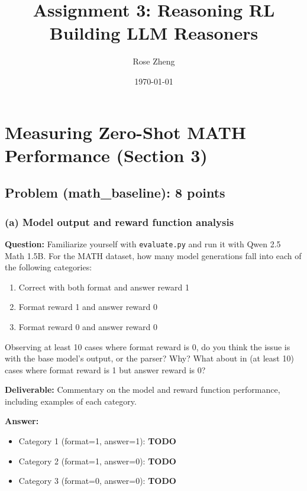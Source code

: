 \documentclass[11pt]{article}
\title{Assignment 3: Reasoning RL \\ Building LLM Reasoners}
\author{Rose Zheng}
\date{\today}
\begin{document}
\maketitle

\section{Measuring Zero-Shot MATH Performance (Section 3)}

\subsection*{Problem (math\_baseline): 8 points}

\subsubsection*{(a) Model output and reward function analysis}

\textbf{Question:} Familiarize yourself with \texttt{evaluate.py} and run it with Qwen 2.5 Math 1.5B. For the MATH dataset, how many model generations fall into each of the following categories:
\begin{enumerate}
  \item Correct with both format and answer reward 1
  \item Format reward 1 and answer reward 0
  \item Format reward 0 and answer reward 0
\end{enumerate}
Observing at least 10 cases where format reward is 0, do you think the issue is with the base model's output, or the parser? Why? What about in (at least 10) cases where format reward is 1 but answer reward is 0?

\textbf{Deliverable:} Commentary on the model and reward function performance, including examples of each category.

\textbf{Answer:}

\begin{itemize}
  \item Category 1 (format=1, answer=1): \textbf{TODO}
  \item Category 2 (format=1, answer=0): \textbf{TODO}
  \item Category 3 (format=0, answer=0): \textbf{TODO}
\end{itemize}
\end{document}
